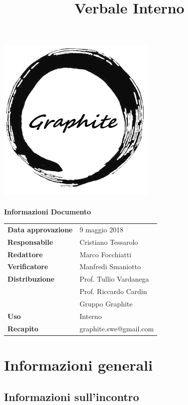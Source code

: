 \documentclass[openany,12pt,a4paper]{article}
\title{Verbale Interno}
\author{}
\begin{document}
	\makeatletter
	\begin{titlepage}
		\setlength{\headsep}{0pt}  
		\begin{center}
			\includegraphics[width=0.5\linewidth]{Logo.png}\\[1em]
			{\huge \bfseries  \@title }\\[10ex]
			\textbf{\Large Informazioni Documento} \\[2em]
			\bgroup
			\def\arraystretch{1.5}
			\begin{tabular}{l|l}
				\textbf{Data approvazione} & 9 maggio 2018 \\
				\textbf{Responsabile} & Cristiano Tessarolo \\
				\textbf{Redattore} & Marco Focchiatti \\
				\textbf{Verificatore} & Manfredi Smaniotto \\
				\textbf{Distribuzione} & Prof. Tullio Vardanega \\
				 & Prof. Riccardo Cardin \\
				 & Gruppo Graphite \\
				\textbf{Uso} & Interno \\
				\textbf{Recapito} & graphite.swe@gmail.com \\
			\end{tabular}
		\egroup
		\end{center}
	\end{titlepage}
	\makeatother

	\thispagestyle{empty}
	\newpage
	
	\tableofcontents
	\newpage
	
	\section{Informazioni generali}
	
	\subsection{Informazioni sull'incontro}
	
\end{document}
